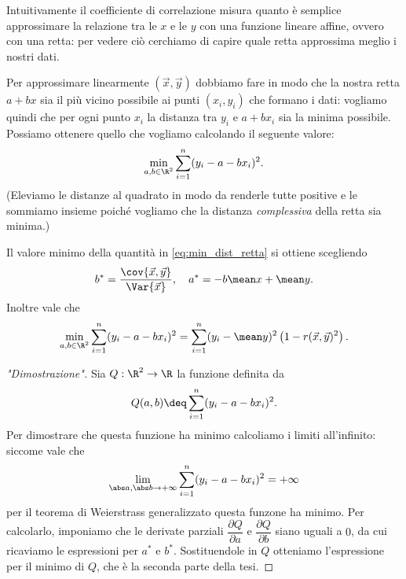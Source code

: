 Intuitivamente il coefficiente di correlazione misura quanto è semplice approssimare la relazione tra le $x$ e le $y$ con una funzione lineare affine, ovvero con una retta: per vedere ciò cerchiamo di capire quale retta approssima meglio i nostri dati.

Per approssimare linearmente $(\vec x, \vec y)$ dobbiamo fare in modo che la nostra retta $a + bx$ sia il più vicino possibile ai punti $(x_i, y_i)$ che formano i dati: vogliamo quindi che per ogni punto $x_i$ la distanza tra $y_i$ e $a+bx_i$ sia la minima possibile. Possiamo ottenere quello che vogliamo calcolando il seguente valore: \begin{equation}
    \min_{a, b \in \R^2} \sum_{i=1}^n (y_i - a - bx_i)^2.   \label{eq:min_dist_retta} 
\end{equation} (Eleviamo le distanze al quadrato in modo da renderle tutte positive e le sommiamo insieme poiché vogliamo che la distanza \emph{complessiva} della retta sia minima.)

\begin{theorem}
    Il valore minimo della quantità in \eqref{eq:min_dist_retta} si ottiene scegliendo \[
        b^\ast = \frac{\cov{\vec x, \vec y}}{\Var{\vec x}}, \quad a^\ast = -b\mean x + \mean y.    
    \] Inoltre vale che \[
        \min_{a, b \in \R^2} \sum_{i=1}^n (y_i - a - bx_i)^2 = \sum_{i= 1}^n (y_i - \mean y)^2\left( 1 - r(\vec x, \vec y)^2 \right).
    \]
\end{theorem}
\begin{proof}
    ["Dimostrazione"] Sia $Q : \R^2 \to \R$ la funzione definita da \[
        Q(a, b) \deq \sum_{i=1}^n (y_i - a - bx_i)^2.
    \] Per dimostrare che questa funzione ha minimo calcoliamo i limiti all'infinito: siccome vale che \[
        \lim_{\abs a, \abs b \to +\infty} \sum_{i=1}^n (y_i - a - bx_i)^2 = +\infty    
    \] per il teorema di Weierstrass generalizzato questa funzone ha minimo. Per calcolarlo, imponiamo che le derivate parziali $\dfrac{\partial Q}{\partial a}$ e $\dfrac{\partial Q}{\partial b}$ siano uguali a $0$, da cui ricaviamo le espressioni per $a^\ast$ e $b^\ast$. Sostituendole in $Q$ otteniamo l'espressione per il minimo di $Q$, che è la seconda parte della tesi.
\end{proof}


